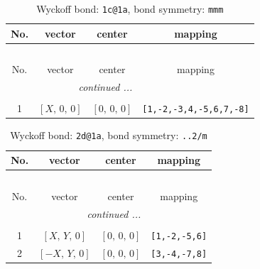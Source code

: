 \documentclass[fleqn,8pt]{jsarticle}
\begin{document}
\renewcommand{\arraystretch}{1.2}
\begin{longtable}{cccc}
\caption{Wyckoff bond: {\tt 1c@1a}, bond symmetry: {\tt mmm}}
 \\
 \hline \hline
No. & vector & center & mapping \\ \hline \endfirsthead

\multicolumn{3}{l}{\tablename\ \thetable{}} \\
 \hline \hline
No. & vector & center & mapping \\ \hline \endhead

 \hline \hline
\multicolumn{3}{r}{\footnotesize\it continued ...} \\ \endfoot

 \hline \hline
\multicolumn{3}{r}{} \\ \endlastfoot

1 & $\left[ X,\, 0,\, 0 \right]$ & $\left[ 0,\, 0,\, 0 \right]$ & {\tt [1,-2,-3,4,-5,6,7,-8]} \\
\end{longtable}
\renewcommand{\arraystretch}{1.2}
\begin{longtable}{cccc}
\caption{Wyckoff bond: {\tt 2d@1a}, bond symmetry: {\tt ..2/m}}
 \\
 \hline \hline
No. & vector & center & mapping \\ \hline \endfirsthead

\multicolumn{3}{l}{\tablename\ \thetable{}} \\
 \hline \hline
No. & vector & center & mapping \\ \hline \endhead

 \hline \hline
\multicolumn{3}{r}{\footnotesize\it continued ...} \\ \endfoot

 \hline \hline
\multicolumn{3}{r}{} \\ \endlastfoot

1 & $\left[ X,\, Y,\, 0 \right]$ & $\left[ 0,\, 0,\, 0 \right]$ & {\tt [1,-2,-5,6]} \\ \hline
2 & $\left[ - X,\, Y,\, 0 \right]$ & $\left[ 0,\, 0,\, 0 \right]$ & {\tt [3,-4,-7,8]} \\
\end{longtable}
\renewcommand{\arraystretch}{1.2}
\end{document}
